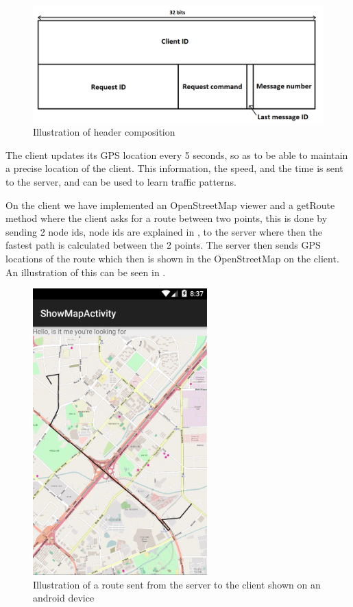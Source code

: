 \begin{figure}[h!]
  \centering
    \includegraphics[width=1\textwidth]{figures/bytesclientserver.png}
    \caption{Illustration of header composition}
    \label{fig:bytesclientserver}
\end{figure}

The client updates its GPS location every 5 seconds, so as to be able to maintain a precise location of the client. This information, the speed, and the time is sent to the server, and can be used to learn traffic patterns.


On the client we have implemented an OpenStreetMap viewer and a getRoute method where the client asks for a route between two points, this is done by sending 2 node ids, node ids are explained in , to the server where then the fastest path is calculated between the 2 points. The server then sends GPS locations of the route which then is shown in the OpenStreetMap on the client. An illustration of this can be seen in .

\begin{figure}[H]
  \centering
    \includegraphics[width=0.6\textwidth]{figures/routeOnMap.png}
    \caption{Illustration of a route sent from the server to the client shown on an android device}
    \label{fig:routeonmap}
\end{figure}
